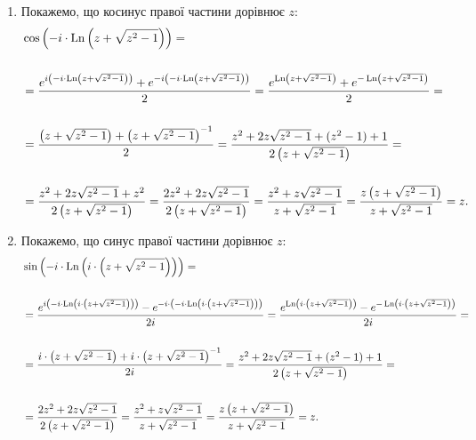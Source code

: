 \begin{solution}
    \begin{enumerate}
        \item Покажемо, що косинус правої частини дорівнює $z$:
        \begin{align*}
            & \cos \left( -i \cdot \operatorname{Ln} \left( z + \sqrt{z^2 - 1} \right) \right) = \\
            \\ 
            &= \dfrac{e^{i \left( -i \cdot \operatorname{Ln} \left( z + \sqrt{z^2 - 1} \right) \right)} + e^{-i \left( -i \cdot \operatorname{Ln} \left( z + \sqrt{z^2 - 1} \right) \right)}}{2} = \dfrac{e^{\operatorname{Ln} \left( z + \sqrt{z^2 - 1} \right)} + e^{-\operatorname{Ln} \left( z + \sqrt{z^2 - 1} \right)}}{2} = \\
            \\
            &= \dfrac{\left(z + \sqrt{z^2 - 1} \right) + \left(z + \sqrt{z^2 - 1} \right)^{-1}}{2} = \dfrac{z^2 + 2z\sqrt{z^2 - 1} + (z^2 - 1) + 1}{2\left(z + \sqrt{z^2 - 1} \right)} = \\
            \\
            &= \dfrac{z^2 + 2z\sqrt{z^2 - 1} + z^2}{2\left(z + \sqrt{z^2 - 1} \right)} = \dfrac{2z^2 + 2z\sqrt{z^2 - 1}}{2\left(z + \sqrt{z^2 - 1} \right)} = \dfrac{z^2 + z\sqrt{z^2 - 1}}{z + \sqrt{z^2 - 1}} = \dfrac{z\left(z + \sqrt{z^2 - 1}\right)}{z + \sqrt{z^2 - 1}} = z.
        \end{align*}
        \item Покажемо, що синус правої частини дорівнює $z$:
        \begin{align*}
            & \sin \left( -i \cdot \Ln \left( i \cdot \left( z + \sqrt{z^2 - 1} \right) \right) \right) = \\
            \\ 
            &= \dfrac{e^{i \left( -i \cdot \Ln \left( i \cdot \left( z + \sqrt{z^2 - 1} \right) \right)\right)} - e^{-i \cdot \left( -i \cdot \Ln \left( i \cdot \left( z + \sqrt{z^2 - 1} \right) \right)\right)}}{2i} = \dfrac{e^{\Ln \left( i \cdot \left( z + \sqrt{z^2 - 1} \right)\right)} - e^{-\Ln \left(i \cdot \left( z + \sqrt{z^2 - 1} \right)\right)}}{2i} = \\
            \\
            &= \dfrac{i \cdot \left(z + \sqrt{z^2 - 1} \right) + i \cdot \left(z + \sqrt{z^2 - 1} \right)^{-1}}{2i} = \dfrac{z^2 + 2z\sqrt{z^2 - 1} + (z^2 - 1) + 1}{2\left(z + \sqrt{z^2 - 1} \right)} = \\
            \\
            &= \dfrac{2z^2 + 2z\sqrt{z^2 - 1}}{2\left(z + \sqrt{z^2 - 1} \right)} = \dfrac{z^2 + z\sqrt{z^2 - 1}}{z + \sqrt{z^2 - 1}} = \dfrac{z\left(z + \sqrt{z^2 - 1}\right)}{z + \sqrt{z^2 - 1}} = z.

\end{align*}
\end{enumerate}
\end{solution}
